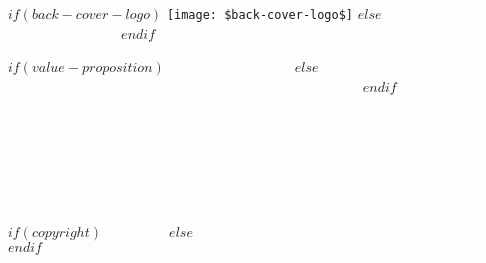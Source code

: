 \clearpage
\thispagestyle{empty}
\pagecolor{primaryblue}
\begin{center}
\vspace*{3cm}

$if(back-cover-logo)$
\texttt{[image: \$back-cover-logo\$]}
$else$
\textcolor{white}{\Huge\textbf{STACK}\\\Large INTELLIGENCE}
$endif$

\vspace{3cm}

$if(value-proposition)$
{\Large\textcolor{white}{$value-proposition$}}
$else$
{\Large\textcolor{white}{Transform your customer relationships from one-time transactions to lifetime value}}
$endif$

\vspace{3cm}

{\normalsize\textcolor{white}{
$if(website)$
Website: $website$\\
$endif$
$if(contact-name)$
Executive Contact: $contact-name$$if(contact-title)$, $contact-title$$endif$\\
$endif$
$if(contact-email)$
Email: $contact-email$\\
$endif$
$if(contact-phone)$
Phone: $contact-phone$
$endif$
}}

\vspace{2cm}

$if(copyright)$
{\small\textcolor{white}{$copyright$}}
$else$
{\small\textcolor{white}{© $year$ Stack Intelligence. All rights reserved.}}
$endif$
\end{center}
\pagecolor{white}